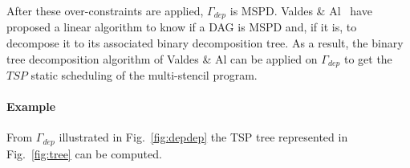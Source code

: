% 
% 

After these over-constraints are applied, $\Gamma_{dep}$ is MSPD. Valdes \& Al~\cite{Valdes:1979:RSP:800135.804393} have proposed a linear algorithm to know if a DAG is MSPD and, if it is, to decompose it to its associated binary decomposition tree. As a result, the binary tree decomposition algorithm of Valdes \& Al can be applied on $\Gamma_{dep}$ to get the $TSP$ static scheduling of the multi-stencil program.

\paragraph{\textbf{Example}} From $\Gamma_{dep}$ illustrated in Fig.~\ref{fig:depdep} the TSP tree represented in Fig.~\ref{fig:tree} can be computed.


